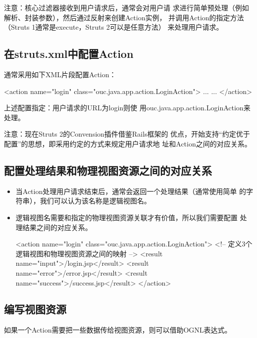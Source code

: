 {\Blue\kai 注意：核心过滤器接收到用户请求后，通常会对用户请
  求进行简单预处理（例如解析、封装参数），然后通过反射来创建Action实例，
  并调用Action的指定方法（Struts 1通常是execute，Struts 2可以是任意方法）
  来处理用户请求。}

\subsection{在struts.xml中配置Action}

通常采用如下XML片段配置Action：

\begin{xmlCode}
  <action name="login" class="ouc.java.app.action.LoginAction">
  ... ...
  </action>
\end{xmlCode}

上述配置指定：用户请求的URL为login则使
用ouc.java.app.action.LoginAction来处理。

{\Blue\kai 注意：现在Struts 2的Convension插件借鉴Rails框架的
  优点，开始支持“约定优于配置”的思想，即采用约定的方式来规定用户请求地
  址和Action之间的对应关系。}

\subsection{配置处理结果和物理视图资源之间的对应关系}

\begin{itemize}
\item 当Action处理用户请求结束后，通常会返回一个处理结果（通常使用简单
  的字符串），我们可以认为该名称是{\hei\Red 逻辑视图名}。
\item 逻辑视图名需要和指定的物理视图资源关联才有价值，所以我们需要配置
  处理结果之间的对应关系。

  \begin{xmlCode}
    <action name="login" class="ouc.java.app.action.LoginAction">
      <!-- 定义3个逻辑视图和物理视图资源之间的映射 -->
      <result name="input">/login.jsp</result>
      <result name="error">/error.jsp</result>
      <result name="success">/success.jsp</result>
    </action>  
  \end{xmlCode}
\end{itemize}

\subsection{编写视图资源}

如果一个Action需要把一些数据传给视图资源，则可以借助{\Red\hei OGNL表达式}。

